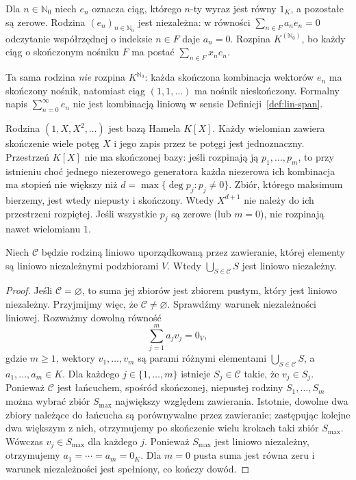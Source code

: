 \begin{przyklad}
\label{prz:lin-baza-skonczony-nosnik}
Dla \(n\in\mathbb N_0\) niech \(e_n\) oznacza ciąg,
którego \(n\)-ty wyraz jest równy \(1_K\),
a pozostałe są zerowe.
Rodzina \((e_n)_{n\in\mathbb N_0}\)
jest niezależna: w równości
\(\sum_{n\in F}a_ne_n=0\) odczytanie współrzędnej
o indeksie \(n\in F\) daje \(a_n=0\).
Rozpina \(K^{(\mathbb N_0)}\), bo każdy ciąg
o skończonym nośniku \(F\) ma postać
\(\sum_{n\in F}x_ne_n\).

Ta sama rodzina \emph{nie} rozpina
\(K^{\mathbb N_0}\): każda skończona kombinacja
wektorów \(e_n\) ma skończony nośnik, natomiast
ciąg \((1,1,\ldots)\) ma nośnik nieskończony.
Formalny napis \(\sum_{n=0}^{\infty}e_n\)
nie jest kombinacją liniową w sensie
Definicji~\ref{def:lin-span}.
\end{przyklad}

\begin{przyklad}
\label{prz:lin-baza-kx}
Rodzina \((1,X,X^2,\ldots)\) jest bazą Hamela \(K[X]\).
Każdy wielomian zawiera skończenie wiele potęg \(X\)
i jego zapis przez te potęgi jest jednoznaczny.
Przestrzeń \(K[X]\) nie ma skończonej bazy:
jeśli rozpinają ją \(p_1,\ldots,p_m\),
to przy istnieniu choć jednego niezerowego
generatora każda niezerowa ich kombinacja
ma stopień nie większy niż
\(d=\max\{\deg p_j:p_j\neq0\}\).
Zbiór, którego maksimum bierzemy, jest
wtedy niepusty i skończony.
Wtedy \(X^{d+1}\) nie należy do ich przestrzeni
rozpiętej. Jeśli wszystkie \(p_j\) są zerowe
(lub \(m=0\)), nie rozpinają nawet wielomianu \(1\).
\end{przyklad}

\begin{lemat}
\label{lem:lin-lancuchy}
Niech \(\mathcal C\) będzie rodziną liniowo
uporządkowaną przez zawieranie,
której elementy są liniowo niezależnymi
podzbiorami \(V\).
Wtedy \(\bigcup_{S\in\mathcal C}S\)
jest liniowo niezależny.
\end{lemat}
\begin{proof}
Jeśli \(\mathcal C=\varnothing\), to suma jej zbiorów
jest zbiorem pustym, który jest liniowo niezależny.
Przyjmijmy więc, że \(\mathcal C\neq\varnothing\).
Sprawdźmy warunek niezależności liniowej.
Rozważmy dowolną równość
\[
 \sum_{j=1}^{m}a_jv_j=0_V,
\]
gdzie \(m\geq1\), wektory
\(v_1,\ldots,v_m\) są parami różnymi
elementami \(\bigcup_{S\in\mathcal C}S\),
a \(a_1,\ldots,a_m\in K\).
Dla każdego \(j\in\{1,\ldots,m\}\)
istnieje \(S_j\in\mathcal C\) takie,
że \(v_j\in S_j\).
Ponieważ \(\mathcal C\) jest łańcuchem,
spośród skończonej, niepustej rodziny
\(S_1,\ldots,S_m\) można wybrać
zbiór \(S_{\max}\) największy względem zawierania.
Istotnie, dowolne dwa zbiory należące
do łańcucha są porównywalne przez zawieranie;
zastępując kolejne dwa większym z nich,
otrzymujemy po skończenie wielu krokach
taki zbiór \(S_{\max}\).
Wówczas \(v_j\in S_{\max}\) dla każdego \(j\).
Ponieważ \(S_{\max}\) jest liniowo niezależny,
otrzymujemy \(a_1=\cdots=a_m=0_K\).
Dla \(m=0\) pusta suma jest równa zeru
i warunek niezależności jest spełniony,
co kończy dowód.
\end{proof}

